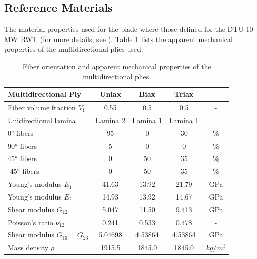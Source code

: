 \clearpage

\subsection{Reference Materials}
\label{sec:reference_mats}

The material properties used for the blade where those defined for the DTU 10 MW RWT (for more details, see \cite{dtu10mwrwt}).
Table \ref{tab:robi_matprop_laminates} lists the apparent mechanical properties of the multidirectional plies used. 

\begin{table}[h!]
\setlength\extrarowheight{2pt}
\centering
\begin{threeparttable}
\begin{tabular}{lcccc}
Multidirectional Ply    &  \multicolumn{1}{c}{Uniax}  &  \multicolumn{1}{c}{Biax}  & \multicolumn{1}{c}{Triax}  & \tabularnewline
\hline
Fiber volume fraction  $V_\text{f}$   &  0.55  &  0.5  &  0.5  &  -        \tabularnewline
Unidirectional lamina  & \multicolumn{1}{c}{Lamina 2} & \multicolumn{1}{c}{Lamina 1}    & \multicolumn{1}{c}{Lamina 1} & \tabularnewline
\hline
\ang{0} fibers                        &  95    &  0    &  30   & \%  \tabularnewline
\ang{90} fibers                       &  5     &  0    &  0    & \%  \tabularnewline
\ang[retain-explicit-plus]{+45} fibers                       &  0     &  50   &  35   & \%  \tabularnewline
\ang{-45} fibers                      &  0     &  50   &  35   & \%  \tabularnewline
\hline
Young's modulus      $E_1$            &  41.63   & 13.92   &   21.79  & GPa      \tabularnewline
Young's modulus      $E_2$            &  14.93   & 13.92   &   14.67  & GPa      \tabularnewline
Shear modulus     $G_{12}$            &  5.047   & 11.50   &   9.413  & GPa      \tabularnewline
Poisson's ratio $\nu_{12}$            &  0.241   & 0.533   &   0.478  & -        \tabularnewline
Shear modulus $G_{13}=G_{23}$\tnote{(a)} &  5.04698 & 4.53864 &  4.53864 & GPa      \tabularnewline
Mass density        $\rho$            &  1915.5  & 1845.0  &  1845.0  &  $kg/m^3$  \tabularnewline
\hline
\end{tabular}
\end{threeparttable}
\caption{Fiber orientation and apparent mechanical properties of the multidirectional plies.}
\label{tab:robi_matprop_laminates}
\end{table}

